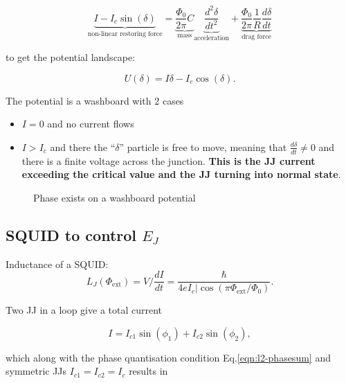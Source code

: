 \begin{equation}
  \underbrace{I - I_c\sin(\delta)}_{\text{non-linear restoring force}} = \underbrace{ \frac{\Phi_{0}}{2\pi}C}_{\text{mass}}\underbrace{\frac{d^2\delta}{dt^2}}_{\text{acceleration}} + \underbrace{\frac{\Phi_{0}}{2\pi}\frac{1}{R}\frac{d\delta}{dt}}_{\text{drag force}}
\end{equation}

\noindent to get the potential landscape:

\begin{equation}
  U(\delta) = I\delta - I_c\cos(\delta).
\end{equation}

\noindent The potential is a washboard with 2 cases
\begin{itemize}
\item $I=0$ and no current flows
\item  $I>I_c$ and  there the  ``$\delta$''  particle is  free to  move,
  meaning that $\frac{d\delta}{dt} \ne 0$  and there is a finite voltage
  across the  junction.  \textbf{This  is the  JJ current  exceeding the
    critical value and the JJ turning into normal state}.
\end{itemize}

\begin{figure}[h]
  \centering {}
  \caption{\small      Phase       exists      on       a      washboard
    potential\label{fig:jj_washboard}}
\end{figure}

\subsection{SQUID to control $ E_J $\cite{zhu2010}}
\begin{framed}\noindent
  Inductance of a SQUID:
  \begin{equation}\label{l2:squid:inductance}
    L_J(\Phi_\text{ext}) = V/\frac{dI}{dt} = \frac{\hbar}{4eI_c|\cos(\pi\Phi_\text{ext}/\Phi_0)}.
  \end{equation}
\end{framed}

Two JJ in a loop give a total current

    \begin{equation}
      I = I_{c1}\sin(\phi_1)+I_{c2}\sin(\phi_2),
    \end{equation}

    \noindent  which   along  with  the  phase   quantisation  condition
    Eq.\eqref{eqn:l2-phasesum}  and  symmetric  JJs  $I_{c1}=I_{c2}=I_c$
    results in

